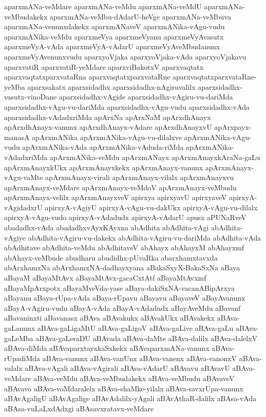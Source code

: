 {aparxmANa-veMdare
aparxmANa-veMdu
aparxmANa-veMdU
aparxmANa-veMbudakekx
aparxmANa-veMbu-dAdarU-heVge
aparxmANa-veMbuva
aparxmANa-venunxdakekx
aparxmANaveV
aparxmANika-vAgu-vudu
aparxmANika-veMdu
aparxmeVya
aparxmeVyanu
aparxmeVyAvasutx
aparxmeVyA-vAda
aparxmeVyA-vAdarU
aparxmeVyAveMbudanunx
aparxmeVyAvenunxvudu
aparxyoVjaka
aparxyoVjaka-vAda
aparxyoVjakavu
aparxvatiR
aparxvatiR-yeMdare
aparxviBakotxV
aparxvaqtatx
aparxvaqtatxparxvataRna
aparxvaqtatxparxvataRne
aparxvaqtatxparxvataRne-yeMba
aparxsakatx
aparxsidadhx
aparxsidadhx-nAgiruvalilx
aparxsidadhx-vasutx-vinoDane
aparxsidadhx-vAgide
aparxsidadhx-vAgiru-vu-dariMda
aparxsidadhx-vAgu-vu-dariMda
aparxsidadhx-vAgu-vudu
aparxsidadhx-vAda
aparxsidadhx-vAdadxriMda
apArxNa
apArxNaM
apArxdhAnayx
apArxdhAnayx-vanunx
apArxdhAnayx-vAdare
apArxdhAnayxvU
apArxpayx-manasA
apArxmANika
apArxmANika-vAgu-vu-dilalxve
apArxmANika-vAgu-vudu
apArxmANika-vAda
apArxmANika-vAduda-riMda
apArxmANika-vAdadxriMda
apArxmANika-veMdu
apArxmANayx
apArxmAnayxkAraNa-gaLu
apArxmAnayxkUkx
apArxmAnayxkekx
apArxmAnayx-vanunx
apArxmAnayx-vAgu-vaMte
apArxmAnayx-virali
apArxmAnayx-vilalx
apArxmAnayxvu
apArxmAnayx-veMdare
apArxmAnayx-veMdoV
apArxmAnayx-veMbudu
apArxmAnayx-velilx
apArxmAnayxveV
apirxya
apirxyavU
apirxyaveV
apirxyA-vAgidadxrU
apirxyA-vAgiyU
apirxyA-vAgu-vu-dakUkx
apirxyA-vAgu-vu-dilalx
apirxyA-vAgu-vudo
apirxyA-vAdadudx
apirxyA-vAdarU
apusx
aPUNaRveV
abadadhx-vAda
abadadhxvAyxKAyxna
abAdhita
abAdhita-vAgi
abAdhita-vAgiye
abAdhita-vAgiru-vu-dakekx
abAdhita-vAgiru-vu-dariMda
abAdhita-vAda
abAdhitave
abAdhita-veMdu
abAdhitaveV
abAhayx
abAhayxM
abAhayxmf
abAhayx-veMbude
abudharu
abudidhx-pUvaRka
abarxhamxtavxda
abArxhamxNa
abArxhamxNA-dadhayxyana
aBakaSxyX-BakaSxNa
aBaya
aBayaM
aBayaMtAvx
aBayaMtAvx-gacaCxtAtf
aBayaMtAvxmf
aBayaMpArxpotx
aBayaMveVda-yase
aBaya-dakiSxNA-vacanABipArxya
aBayanu
aBaya-rUpa-vAda
aBaya-rUpavu
aBayavu
aBayaveV
aBayAvanunx
aBayA-vAgiru-vudu
aBayA-vAda
aBayA-vAdadudx
aBayAveMdu
aBavanf
aBavaninxti
aBavanasx
aBAva
aBAvakukx
aBAvakUkx
aBAvakekx
aBAva-gaLanunx
aBAva-gaLigaMtU
aBAva-gaLigoV
aBAva-gaLive
aBAva-gaLu
aBAva-gaLeMba
aBAva-gaLeraDU
aBAvada
aBAva-daMte
aBAva-dalilx
aBAva-dalelxV
aBAva-diMda
aBAvaparxtayxkaSxkekx
aBAvaparxmANa-vanunx
aBAva-rUpadiMda
aBAva-vanunx
aBAva-vanUnx
aBAva-vanenx
aBAva-vanonxV
aBAva-valalx
aBAva-vAgali
aBAva-vAgirali
aBAva-vAdarU
aBAvavu
aBAvavU
aBAva-veMdare
aBAva-veMdu
aBAva-veMbudakekx
aBAva-veMbudu
aBAvaveV
aBAvavo
aBAva-voMdaralelx
aBAva-shaMke-yilalx
aBAva-savxrUpa-vanunx
aBAvAgaligU
aBAvAgalige
aBAvAdalilx-yAgali
aBAvAthaR-dalilx
aBAsa-vAda
aBAsa-vuLaLxdAdxgi
aBAsavxratavx-veMdare
}
